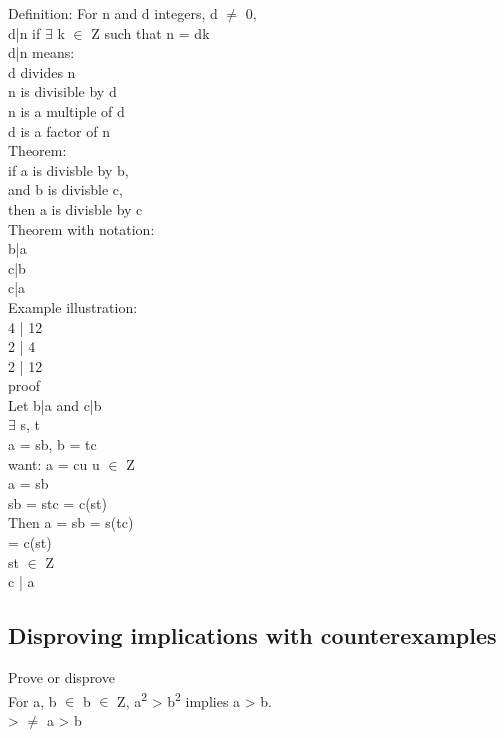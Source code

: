 \documentclass[11pt]{article}
\begin{document}
Definition: For n and d integers, d \(\neq\) 0,\\
d|n \iff if \(\exists\) k \(\in\) Z such that n = dk\\

d|n means:\\
d divides n\\
n is divisible by d\\
n is a multiple of d\\
d is a factor of n\\

Theorem:\\
if a is divisble by b,\\
and b is divisble c,\\
then a is divisble by c\\

Theorem with notation:\\
b|a\\
c|b\\
c|a\\

Example illustration:\\
4 | 12\\
2 | 4\\
2 | 12\\

proof\\
Let b|a and c|b\\
\(\exists\) s, t\\
a = sb, b = tc\\

want: a = cu u \(\in\)  Z\\
a = sb\\
sb  = stc = c(st)\\

Then a = sb = s(tc)\\
= c(st)\\
st \(\in\) Z\\
c | a \square\\

\subsection{Disproving implications with counterexamples}
\label{sec:org32188a9}
Prove or disprove\\
For a, b \(\in\) b \(\in\) Z, a\textsuperscript{2} > b\textsuperscript{2} implies a > b.\\

\textpm{} > \textpm{} \(\neq\) a > b\\
\end{document}
